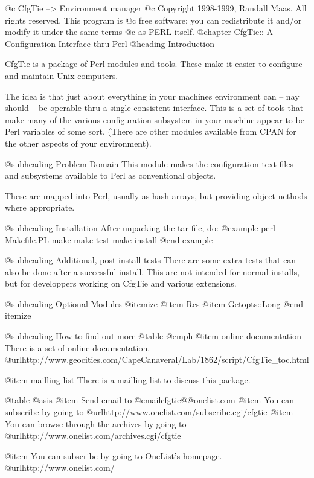 @c CfgTie --> Environment manager
@c Copyright 1998-1999, Randall Maas.  All rights reserved.  This program is
@c free software; you can redistribute it and/or modify it under the same terms
@c as PERL itself.                                                                   
@chapter CfgTie:: A Configuration Interface thru Perl
@heading Introduction

CfgTie is a package of Perl modules and tools.  These make it easier to
configure and maintain Unix computers.

The idea is that just about everything in your machines environment can --
nay should -- be operable thru a single consistent interface.  This is a
set of tools that make many of the various configuration subsystem in your
machine appear to be Perl variables of some sort.  (There are other modules
available from CPAN for the other aspects of your environment).

@subheading Problem Domain
This module makes the configuration text files and subsystems available to
Perl as conventional objects.

These are mapped into Perl, usually as hash arrays, but providing object
nethods where appropriate.

@subheading Installation
After unpacking the tar file, do:
@example
        perl Makefile.PL 
        make 
        make test
        make install
@end example

@subheading Additional, post-install tests
There are some extra tests that can also be done after a successful install.
This are not intended for normal installs, but for developpers working on CfgTie
and various extensions.

@subheading Optional Modules
@itemize
@item Rcs
@item Getopts::Long
@end itemize

@subheading How to find out more
@table @emph
@item online documentation
There is a set of online documentation.
@url{http://www.geocities.com/CapeCanaveral/Lab/1862/script/CfgTie_toc.html}

@item mailling list
There is a mailling list to discuss this package.

@table @asis
@item Send email to @email{cfgtie@@onelist.com}
@item You can subscribe by going to
@url{http://www.onelist.com/subscribe.cgi/cfgtie}
@item You can browse through the archives by going to
 @url{http://www.onelist.com/archives.cgi/cfgtie}

@item You can subscribe by going to OneList's homepage.  @url{http://www.onelist.com/}

